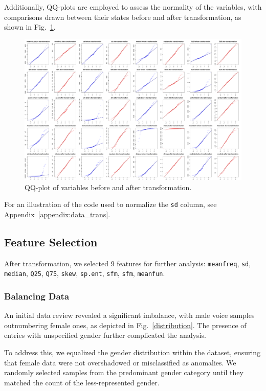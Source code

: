 \documentclass{article}
\begin{document}
	Additionally, QQ-plots are employed to assess the normality of the variables, with comparisons drawn between their states before and after transformation, as shown in Fig.~\ref{transformation_qq}.
	\begin{figure}
		\centering
		\includegraphics[width=\textwidth]{graphs/transformations_qq.pdf}
		\caption{QQ-plot of variables before and after transformation.}
		\label{transformation_qq}
	\end{figure}
	
	For an illustration of the code used to normalize the \texttt{sd} column, see Appendix~\ref{appendix:data_trans}.	
	
	\subsection{Feature Selection}
	
	After transformation, we selected 9 features for further analysis: \texttt{meanfreq}, \texttt{sd}, \texttt{median}, \texttt{Q25}, \texttt{Q75}, \texttt{skew}, \texttt{sp.ent}, \texttt{sfm}, \texttt{sfm}, \texttt{meanfun}.
	
	\subsubsection{Balancing Data}
	
	An initial data review revealed a significant imbalance, with male voice samples outnumbering female ones, as depicted in Fig.~\ref{distribution}. The presence of entries with unspecified gender further complicated the analysis.
	
	To address this, we equalized the gender distribution within the dataset, ensuring that female data were not overshadowed or misclassified as anomalies. We randomly selected samples from the predominant gender category until they matched the count of the less-represented gender.
	
\end{document}
